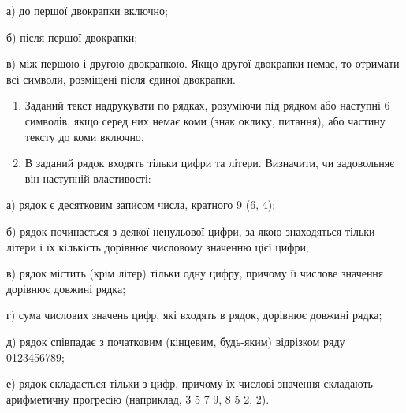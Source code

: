 \documentclass[]{article}
\begin{document}
а) до першої двокрапки включно;

б) після першої двокрапки;

в) між першою і другою двокрапкою. Якщо другої двокрапки немає, то
отримати всі символи, розміщені після єдиної двокрапки.

\begin{enumerate}
\def\labelenumi{\arabic{enumi})}
\setcounter{enumi}{5}
\item
  Заданий текст надрукувати по рядках, розуміючи під рядком або наступні
  6 символів, якщо серед них немає коми (знак оклику, питання), або
  частину тексту до коми включно.
\item
  В заданий рядок входять тільки цифри та літери. Визначити, чи
  задовольняє він наступній властивості:
\end{enumerate}

а) рядок є десятковим записом числа, кратного 9 (6, 4);

б) рядок починається з деякої ненульової цифри, за якою знаходяться
тільки літери і їх кількість дорівнює числовому значенню цієї цифри;

в) рядок містить (крім літер) тільки одну цифру, причому її числове
значення дорівнює довжині рядка;

г) сума числових значень цифр, які входять в рядок, дорівнює довжині
рядка;

д) рядок співпадає з початковим (кінцевим, будь-яким) відрізком ряду
0123456789;

е) рядок складається тільки з цифр, причому їх числові значення
складають арифметичну прогресію (наприклад, 3 5 7 9, 8 5 2, 2).
\end{document}
